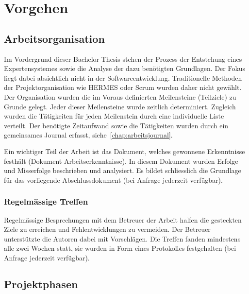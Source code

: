 \chapter{Vorgehen}
\label{chap:vorgehen}

\section{Arbeitsorganisation}
\label{sec:vorgehen_orga}
Im Vordergrund dieser Bachelor-Thesis stehen der Prozess der Entstehung eines Expertensystemes sowie die Analyse der dazu benötigten Grundlagen. Der Fokus liegt dabei absichtlich nicht in der Softwareentwicklung. Traditionelle Methoden der Projektorganisation wie HERMES oder Scrum wurden daher nicht gewählt.\\
Der Organisation wurden die im Voraus definierten Meilensteine (Teilziele) zu Grunde gelegt. Jeder dieser Meilensteine wurde zeitlich determiniert. Zugleich wurden die Tätigkeiten für jeden Meilenstein durch eine individuelle Liste verteilt. Der benötigte Zeitaufwand sowie die Tätigkeiten wurden durch ein gemeinsames Journal erfasst, siehe~\ref{chap:arbeitsjournal}.

Ein wichtiger Teil der Arbeit ist das Dokument, welches gewonnene Erkenntnisse festhält (Dokument Arbeitserkenntnisse). In diesem Dokument wurden Erfolge und Misserfolge beschrieben und analysiert. Es bildet schliesslich die Grundlage für das vorliegende Abschlussdokument (bei Anfrage jederzeit verfügbar).

\subsection{Regelmässige Treffen}
\label{sec:vorgehen_orga_treffen}
Regelmässige Besprechungen mit dem Betreuer der Arbeit halfen die gesteckten Ziele zu erreichen und Fehlentwicklungen zu vermeiden. Der Betreuer unterstützte die Autoren dabei mit Vorschlägen. Die Treffen fanden mindestens alle zwei Wochen statt, sie wurden in Form eines Protokolles festgehalten (bei Anfrage jederzeit verfügbar).

\section{Projektphasen}
\label{sec:projektphasen}

